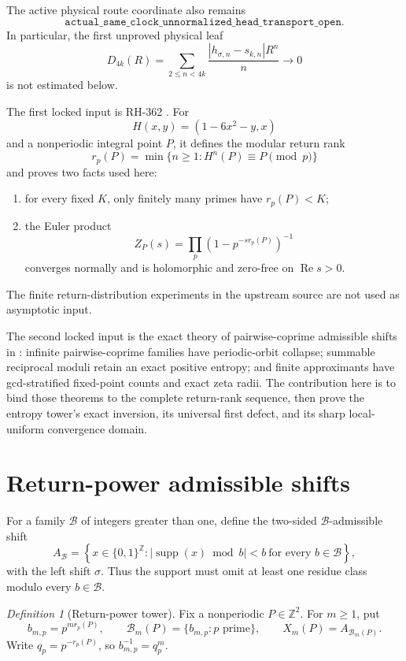 \documentclass[11pt]{article}
\numberwithin{equation}{section}
\theoremstyle{remark}
\newtheorem{definition}[theorem]{Definition}
\newcommand{\supp}{\operatorname{supp}}
\newcommand{\RePart}{\operatorname{Re}}
\newcommand{\Z}{\mathbb Z}
\newcommand{\cB}{\mathcal B}
\begin{document}
The active physical route coordinate also remains
\[
 \texttt{actual\_same\_clock\_unnormalized\_head\_transport\_open}.
\]
In particular, the first unproved physical leaf
\[
 D_{4k}(R)=\sum_{2\le n<4k}
 \frac{|h_{\sigma,n}-s_{k,n}|R^n}{n}\longrightarrow0
\]
is not estimated below.

The first locked input is RH-362 \citep{WangRH3622026}.  For
\[
 H(x,y)=(1-6x^2-y,x)
\]
and a nonperiodic integral point $P$, it defines the modular return rank
\[
 r_p(P)=\min\{n\ge1:H^n(P)\equiv P\pmod p\}
\]
and proves two facts used here:
\begin{enumerate}
\item for every fixed $K$, only finitely many primes have $r_p(P)<K$;
\item the Euler product
\begin{equation}
 Z_P(s)=\prod_p(1-p^{-s r_p(P)})^{-1}
 \label{eq:return-euler}
\end{equation}
converges normally and is holomorphic and zero-free on
$\RePart s>0$.
\end{enumerate}
The finite return-distribution experiments in the upstream source are not
used as asymptotic input.

The second locked input is the exact theory of pairwise-coprime admissible
shifts in \citet{WangPeriodicCollapse2026}: infinite pairwise-coprime
families have periodic-orbit collapse; summable reciprocal moduli retain an
exact positive entropy; and finite approximants have gcd-stratified
fixed-point counts and exact zeta radii.  The contribution here is to bind
those theorems to the complete return-rank sequence, then prove the entropy
tower's exact inversion, its universal first defect, and its sharp
local-uniform convergence domain.

\section{Return-power admissible shifts}

For a family $\cB$ of integers greater than one, define the two-sided
$\cB$-admissible shift
\begin{equation}
 A_{\cB}
 =\left\{x\in\{0,1\}^{\Z}:
 |\supp(x)\bmod b|<b\ \text{for every }b\in\cB\right\},
 \label{eq:B-admissible}
\end{equation}
with the left shift $\sigma$.  Thus the support must omit at least one
residue class modulo every $b\in\cB$.

\begin{definition}[Return-power tower]
\label{def:tower}
Fix a nonperiodic $P\in\Z^2$.  For $m\ge1$, put
\begin{equation}
 b_{m,p}=p^{m r_p(P)},
 \qquad
 \cB_m(P)=\{b_{m,p}:p\text{ prime}\},
 \qquad
 X_m(P)=A_{\cB_m(P)}.
 \label{eq:return-power-family}
\end{equation}
Write $q_p=p^{-r_p(P)}$, so $b_{m,p}^{-1}=q_p^m$.
\end{definition}
\end{document}
